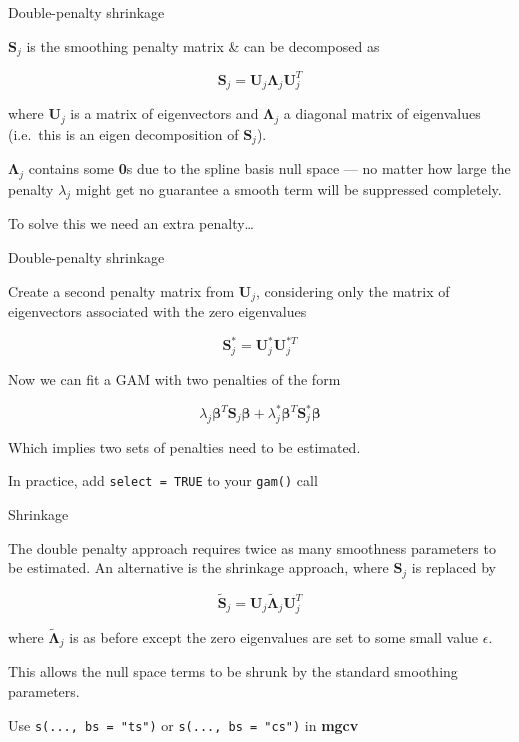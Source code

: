 \documentclass[10pt,ignorenonframetext,compress, aspectratio=169]{beamer}
\begin{document}
\begin{frame}{Double-penalty shrinkage}

\(\mathbf{S}_j\) is the smoothing penalty matrix \& can be decomposed as

\[
\mathbf{S}_j = \mathbf{U}_j\boldsymbol{\Lambda}_j\mathbf{U}_j^{T}
\]

where \(\mathbf{U}_j\) is a matrix of eigenvectors and
\(\boldsymbol{\Lambda}_j\) a diagonal matrix of eigenvalues (i.e.~this
is an eigen decomposition of \(\mathbf{S}_j\)).

\(\boldsymbol{\Lambda}_j\) contains some \textbf{0}s due to the spline
basis null space --- no matter how large the penalty \(\lambda_j\) might
get no guarantee a smooth term will be suppressed completely.

To solve this we need an extra penalty\ldots{}

\end{frame}

\begin{frame}[fragile]{Double-penalty shrinkage}

Create a second penalty matrix from \(\mathbf{U}_j\), considering only
the matrix of eigenvectors associated with the zero eigenvalues

\[
\mathbf{S}_j^{*} = \mathbf{U}_j^{*}\mathbf{U}_j^{*T}
\]

Now we can fit a GAM with two penalties of the form

\[
\lambda_j \mathbf{\beta}^T \mathbf{S}_j \mathbf{\beta} + \lambda_j^{*} \mathbf{\beta}^T \mathbf{S}_j^{*} \mathbf{\beta}
\]

Which implies two sets of penalties need to be estimated.

In practice, add \texttt{select\ =\ TRUE} to your \texttt{gam()} call

\end{frame}

\begin{frame}[fragile]{Shrinkage}

The double penalty approach requires twice as many smoothness parameters
to be estimated. An alternative is the shrinkage approach, where
\(\mathbf{S}_j\) is replaced by

\[
\tilde{\mathbf{S}}_j = \mathbf{U}_j\tilde{\boldsymbol{\Lambda}}_j\mathbf{U}_j^{T}
\]

where \(\tilde{\boldsymbol{\Lambda}}_j\) is as before except the zero
eigenvalues are set to some small value \(\epsilon\).

This allows the null space terms to be shrunk by the standard smoothing
parameters.

Use \texttt{s(...,\ bs\ =\ "ts")} or \texttt{s(...,\ bs\ =\ "cs")} in
\textbf{mgcv}

\end{frame}
\end{document}
